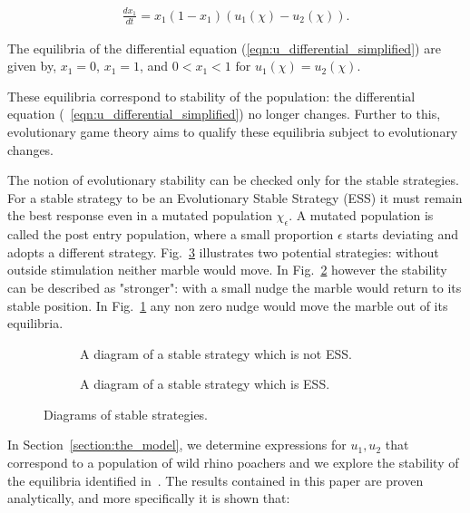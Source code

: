 \documentclass[10pt]{article}
\begin{document}
\begin{eqnarray}
    \label{eqn:u_differential_simplified}
    \frac{dx_1}{dt}= x_1(1 - x_1)(u_1(\chi) - u_2(\chi)).
\end{eqnarray}

The equilibria of the differential equation (\ref{eqn:u_differential_simplified})
are given by, \(x_1=0\), \(x_1=1\), and \(0<x_1<1 \mbox{ for } u_1(\chi)=u_2(\chi)\).

These equilibria correspond to stability of the population: the differential 
equation (~\ref{eqn:u_differential_simplified}) no longer changes. Further to
this, evolutionary game theory aims to qualify these equilibria subject to 
evolutionary changes.

The notion of evolutionary stability can be checked only for the stable strategies.
For a stable strategy to be an Evolutionary Stable Strategy (ESS) it must remain 
the best response even in a mutated population \(\chi_\epsilon\). A mutated population 
is called the post entry population, 
where a small proportion \(\epsilon\) starts deviating and adopts a different strategy.
Fig.~\ref{fig:stable_ess_driagrams} illustrates two potential strategies: without 
outside stimulation neither marble would move. In Fig.~\ref{fig:ess_diagram}
however the stability can be described as "stronger": with a small nudge the marble
would return to its stable position. In Fig.~\ref{fig:stable_diagram} any non zero
nudge would move the marble out of its equilibria.

\begin{figure}[!htbp]
\begin{center}
    \begin{subfigure}{0.40\textwidth}
    
    \caption{\label{fig:stable_diagram} A diagram of a stable strategy which 
    is not ESS.}
    \end{subfigure}
    \begin{subfigure}{0.40\textwidth}
    
    \caption{\label{fig:ess_diagram}A diagram of a stable strategy which is ESS.}
    \end{subfigure}
        \caption{\label{fig:stable_ess_driagrams} Diagrams of stable strategies.}
\end{center}
\end{figure}

In Section~\ref{section:the_model}, we determine expressions
for \(u_1, u_2\) that correspond to a population of wild rhino poachers and we
explore the stability of the equilibria identified in~\cite{Lee}. The results
contained in this paper are proven analytically, and more specifically it is 
shown that:
\end{document}
